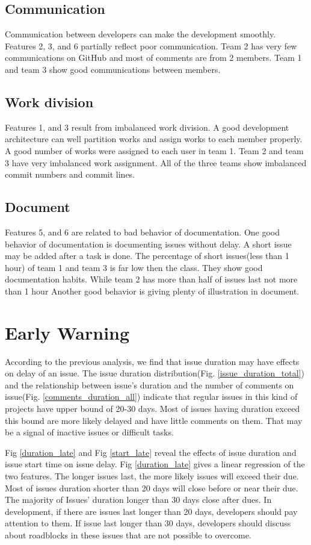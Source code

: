 \documentclass[conference]{IEEEtran}
\begin{document}
\subsection{Communication}
Communication between developers can make the development smoothly. Features 2, 3, and 6 partially reflect poor communication. Team 2 has very few communications on GitHub and most of comments are from 2 members. Team 1 and team 3 show good communications between members.


\subsection{Work division}
Features 1, and 3 result from imbalanced work division. A good development architecture can well partition works and assign works to each member properly. A good number of works were assigned to each user in team 1. Team 2 and team 3 have very imbalanced work assignment. All of the three teams show imbalanced commit numbers and commit lines.

\subsection{Document}
Features 5, and 6 are related to bad behavior of documentation. One good behavior of documentation is documenting issues without delay. A short issue may be added after a task is done. The percentage of short issues(less than 1 hour) of team 1 and team 3 is far low then the class. They show good documentation habits. While team 2 has more than half of issues last not more than 1 hour Another good behavior is giving plenty of illustration in document.

\section{Early Warning}
According to the previous analysis, we find that issue duration may have effects on delay of an issue. The issue duration distribution(Fig. \ref{issue_duration_total}) and the relationship between issue's duration and the number of comments on issue(Fig. \ref{comments_duration_all}) indicate that regular issues in this kind of projects have upper bound of 20-30 days. Most of issues having duration exceed this bound are more likely delayed and have little comments on them. That may be a signal of inactive issues or difficult tasks. 

Fig \ref{duration_late} and Fig \ref{start_late} reveal the effects of issue duration and issue start time on issue delay. Fig \ref{duration_late} gives a linear regression of the two features. The longer issues last, the more likely issues will exceed their due. Most of issues duration shorter than 20 days will close before or near their due. The majority of Issues' duration longer than 30 days close after dues. In development, if there are issues last longer than 20 days, developers should pay attention to them. If issue last longer than 30 days, developers should discuss about roadblocks in these issues that are not possible to overcome. 
\end{document}
